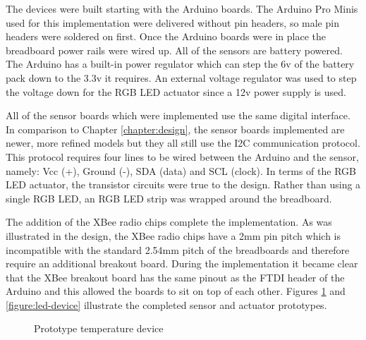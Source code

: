       The devices were built starting with the Arduino boards. The Arduino Pro Minis used for this implementation were delivered without pin headers, so male pin headers were soldered on first. Once the Arduino boards were in place the breadboard power rails were wired up. All of the sensors are battery powered. The Arduino has a built-in power regulator which can step the 6v of the battery pack down to the 3.3v it requires. An external voltage regulator was used to step the voltage down for the RGB LED actuator since a 12v power supply is used.

      All of the sensor boards which were implemented use the same digital interface. In comparison to Chapter \ref{chapter:design}, the sensor boards implemented are newer, more refined models but they all still use the I2C communication protocol. This protocol requires four lines to be wired between the Arduino and the sensor, namely: Vcc (+), Ground (-), SDA (data) and SCL (clock). In terms of the RGB LED actuator, the transistor circuits were true to the design. Rather than using a single RGB LED, an RGB LED strip was wrapped around the breadboard.

      The addition of the XBee radio chips complete the implementation. As was illustrated in the design, the XBee radio chips have a 2mm pin pitch which is incompatible with the standard 2.54mm pitch of the breadboards and therefore require an additional breakout board. During the implementation it became clear that the XBee breakout board has the same pinout as the FTDI header of the Arduino and this allowed the boards to sit on top of each other. Figures \ref{figure:temp-device} and \ref{figure:led-device} illustrate the completed sensor and actuator prototypes.

      \begin{figure}
        \centering
        \caption{Prototype temperature device}\label{figure:temp-device}
      \end{figure}

